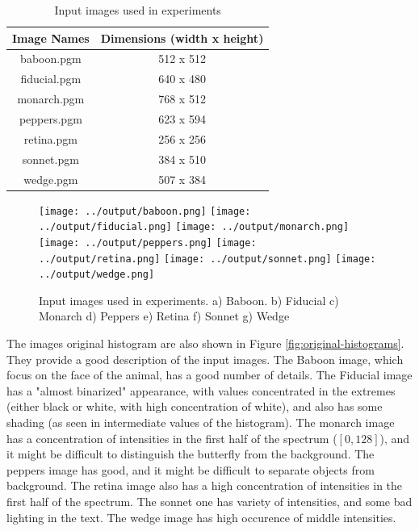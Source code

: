 \documentclass[]{IEEEtran}
\begin{document}
\begin{table}[h!]
\centering
\begin{center}
\begin{tabular}{ |c|c| } 
 \hline
 Image Names & Dimensions (width x height) \\
 \hline
  baboon.pgm &  512 x 512\\ 
 \hline
  fiducial.pgm & 640 x 480\\
 \hline
  monarch.pgm &  768 x 512\\ 
 \hline
  peppers.pgm & 623 x 594\\
 \hline
 retina.pgm & 256 x 256\\
 \hline
 sonnet.pgm & 384 x 510\\
 \hline
 wedge.pgm & 507 x 384\\
 \hline
\end{tabular}
\caption{Input images used in experiments}
\label{table:input}
\end{center}
\end{table}

\begin{figure}[H]
  \centering
  \texttt{[image: ../output/baboon.png]}
  \texttt{[image: ../output/fiducial.png]}
  \texttt{[image: ../output/monarch.png]}
  \texttt{[image: ../output/peppers.png]}
  \texttt{[image: ../output/retina.png]}
  \texttt{[image: ../output/sonnet.png]}
  \texttt{[image: ../output/wedge.png]}
  \caption{Input images used in experiments. a) Baboon. b) Fiducial c) Monarch d) Peppers e) Retina f) Sonnet g) Wedge}
  \label{fig:input-images}
\end{figure}

The images original histogram are also shown in Figure \ref{fig:original-histograms}. They provide a good description of the input images. The Baboon image, which focus on the face of the animal, has a good number of details. The Fiducial image has a "almost binarized" appearance, with values concentrated in the extremes (either black or white, with high concentration of white), and also has some shading (as seen in intermediate values of the histogram). The monarch image has a concentration of intensities in the first half of the spectrum ($[0, 128]$), and it might be difficult to distinguish the butterfly from the background. The peppers image has good, and it might be difficult to separate objects from background. The retina image also has a high concentration of intensities in the first half of the spectrum. The sonnet one has variety of intensities, and some bad lighting in the text. The wedge image has high occurence of middle intensities.
\end{document}
